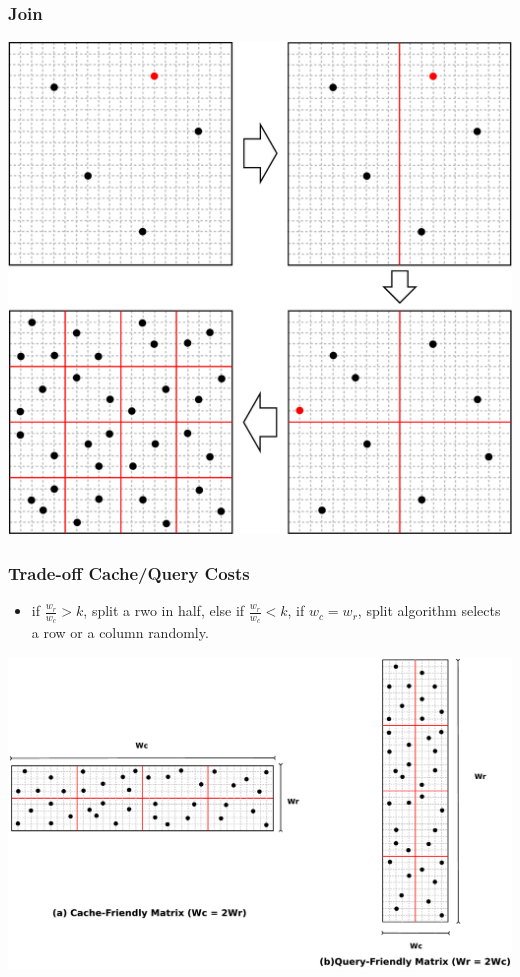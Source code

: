 \documentclass[red]{beamer}
\begin{document}
\begin{frame}
\frametitle{Join}
\begin{center}
\includegraphics[scale=0.15]{figs/ed2_join.eps}
\end{center}
\end{frame}
\begin{frame}
\frametitle{Trade-off Cache/Query Costs}
\begin{itemize}
\item if $\frac{w_r}{w_c} > k$, split a rwo in half, else if $\frac{w_r}{w_c} < k$, if $w_c=w_r$, split algorithm selects a row or a column randomly.
\end{itemize}
\begin{center}
\includegraphics[scale=0.12]{figs/asym_both.eps}
\end{center}
\end{frame}
\end{document}
